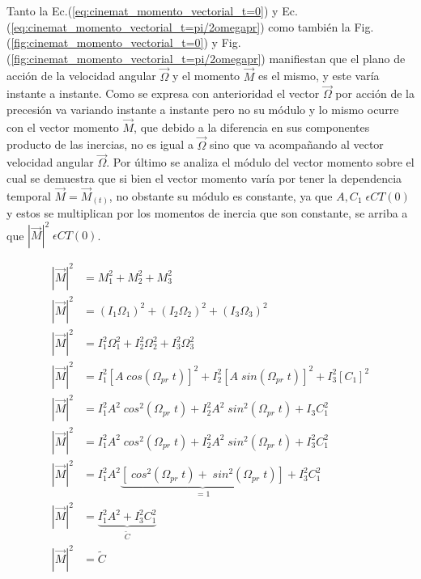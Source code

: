 \documentclass[oneside,a4paper,english,links]{amca}
\begin{document}
Tanto la Ec.(\ref{eq:cinemat_momento_vectorial_t=0}) y Ec.(\ref{eq:cinemat_momento_vectorial_t=pi/2omegapr}) como tambi\'en la Fig.(\ref{fig:cinemat_momento_vectorial_t=0}) y Fig.(\ref{fig:cinemat_momento_vectorial_t=pi/2omegapr}) manifiestan que el plano de acci\'on de la velocidad angular $\vec{\Omega}$ y el momento $\vec{M}$ es el mismo, y este var\'ia instante a instante. Como se expresa con anterioridad el vector $\vec{\Omega}$ por acci\'on de la precesi\'on va variando instante a instante pero no su m\'odulo y lo mismo ocurre con el vector momento $\vec{M}$, que debido a la diferencia en sus componentes producto de las inercias, no es igual a $\vec{\Omega}$ sino que va acompa\~nando al vector velocidad angular $\vec{\Omega}$. Por \'ultimo se analiza el m\'odulo del vector momento sobre el cual se demuestra que si bien el vector momento var\'ia por tener la dependencia temporal $\vec{M}=\vec{M}_{(t)}$, no obstante su m\'odulo es constante, ya que $A,C_1\;\epsilon CT(0)$ y estos se multiplican por los momentos de inercia que son constante, se arriba a que $|\vec{M}|^2\;\epsilon CT(0)$.

\begin{equation}
\begin{split}
    |\vec{M}|^2&=M^2_1+M^2_2+M^2_3\\
    |\vec{M}|^2&=\left(I_1 \Omega_1 \right)^2+\left(I_2 \Omega_2 \right)^2+\left(I_3 \Omega_3 \right)^2\\
    |\vec{M}|^2&=I_1^2 \Omega_1^2+I_2^2 \Omega_2^2+I_3^2 \Omega_3^2\\
    |\vec{M}|^2&=I_1^2 \left[A \;cos\left(\Omega_{pr}\;t\right) \right]^2+I_2^2 \left[A \;sin\left(\Omega_{pr}\;t\right) \right]^2+I_3^2 \left[C_1 \right]^2\\
    |\vec{M}|^2&=I_1^2 A^2 \;cos^2\left(\Omega_{pr}\;t\right)+I_2^2 A^2 \;sin^2\left(\Omega_{pr}\;t\right)+I_3 C_1 ^2\\
    |\vec{M}|^2&=I_1^2 A^2 \;cos^2\left(\Omega_{pr}\;t\right)+I_2^2 A^2 \;sin^2\left(\Omega_{pr}\;t\right)+I_3^2 C_1 ^2\\
    |\vec{M}|^2&=I_1^2 A^2 \underbrace{\left[ \;cos^2\left(\Omega_{pr}\;t\right)+ \;sin^2\left(\Omega_{pr}\;t\right)\right]}_{=1}+I_3^2 C_1 ^2\\
    |\vec{M}|^2&=\underbrace{I_1^2 A^2 +I_3^2 C_1 ^2}_{\tilde{C}}\\
    |\vec{M}|^2&=\tilde{C}
    \end{split}
    \label{eq:cinemat_justif_modulo_momento_cte}
\end{equation}
\end{document}
